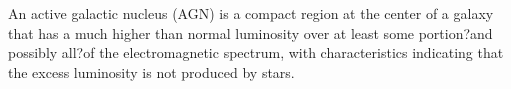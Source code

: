 An active galactic nucleus (AGN) is a compact region at the center of a galaxy that has a much higher than normal luminosity over at least some portion?and possibly all?of the electromagnetic spectrum, with characteristics indicating that the excess luminosity is not produced by stars.

